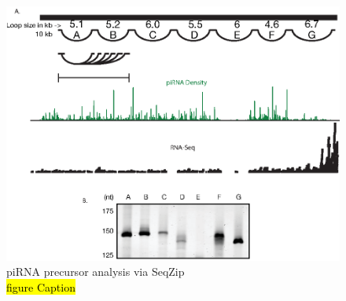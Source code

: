  \begin{figure}[htbp] %
    \centering 
    \includegraphics{Figures/SeqZipMethod/piRNAPrecurserAnalyisBySeqZip.eps}
    \caption[piRNA precursor analysis via SeqZip]
    {
      piRNA precursor analysis via SeqZip\\
      \hl{figure Caption}
    	}
    \label{fig:Hiv tx via SeqZip}
  	\end{figure}



